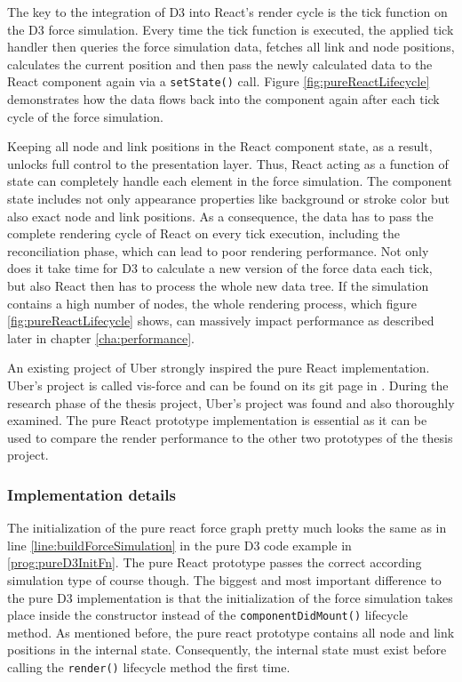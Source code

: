 The key to the integration of D3 into React's render cycle is the tick function on the D3 force simulation. Every time the tick function is executed, the applied tick handler then queries the force simulation data, fetches all link and node positions, calculates the current position and then pass the newly calculated data to the React component again via a \texttt{setState()} call. Figure \ref{fig:pureReactLifecycle} demonstrates how the data flows back into the component again after each tick cycle of the force simulation.

Keeping all node and link positions in the React component state, as a result, unlocks full control to the presentation layer. Thus, React acting as a function of state can completely handle each element in the force simulation. The component state includes not only appearance properties like background or stroke color but also exact node and link positions. As a consequence, the data has to pass the complete rendering cycle of React on every tick execution, including the reconciliation phase, which can lead to poor rendering performance. Not only does it take time for D3 to calculate a new version of the force data each tick, but also React then has to process the whole new data tree. If the simulation contains a high number of nodes, the whole rendering process, which figure \ref{fig:pureReactLifecycle} shows, can massively impact performance as described later in chapter \ref{cha:performance}.

An existing project of Uber strongly inspired the pure React implementation. Uber's project is called vis-force and can be found on its git page in \cite{UberVisForce}. During the research phase of the thesis project, Uber's project was found and also thoroughly examined. The pure React prototype implementation is essential as it can be used to compare the render performance to the other two prototypes of the thesis project.

\subsubsection{Implementation details}

The initialization of the pure react force graph pretty much looks the same as in line \ref{line:buildForceSimulation} in the pure D3 code example in \ref{prog:pureD3InitFn}. The pure React prototype passes the correct according simulation type of course though. The biggest and most important difference to the pure D3 implementation is that the initialization of the force simulation takes place inside the constructor instead of the \texttt{componentDidMount()} lifecycle method. As mentioned before, the pure react prototype contains all node and link positions in the internal state. Consequently, the internal state must exist before calling the \texttt{render()} lifecycle method the first time.

